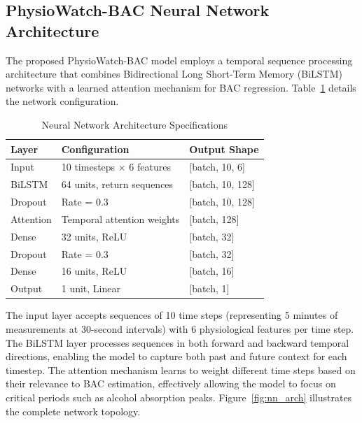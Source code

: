 \documentclass[HARVARD,Times2COL]{WileyNJDv5} %
\providecommand{\DIFadd}[1]{{\protect\color{red} #1}} %
\providecommand{\DIFaddbegin}{} %
\providecommand{\DIFaddend}{} %
\providecommand{\DIFaddincludegraphics}[2][]{{\color{blue}\fbox{\DIFOincludegraphics[#1]{#2}}}} %
\DeclareRobustCommand{\DIFaddbegin}{\DIFOaddbegin \let\includegraphics\DIFaddincludegraphics} %
\DeclareRobustCommand{\DIFaddend}{\DIFOaddend \let\includegraphics\DIFOincludegraphics} %
\begin{document}
\DIFaddend \subsection{PhysioWatch-BAC Neural Network Architecture}
The proposed PhysioWatch-BAC model employs a temporal sequence processing architecture that combines Bidirectional Long Short-Term Memory (BiLSTM) networks with a learned attention mechanism for BAC regression. Table~\ref{tab:model_arch} details the network configuration.
\begin{table}[htbp]
\caption{Neural Network Architecture Specifications}
\label{tab:model_arch}
\centering
\small
\begin{tabular}{@{}lll@{}}
\toprule
\textbf{Layer} & \textbf{Configuration} & \textbf{Output Shape} \\
\midrule
Input & 10 timesteps $\times$ 6 features & [batch, 10, 6] \\
BiLSTM & 64 units, return sequences & [batch, 10, 128] \\
Dropout & Rate = 0.3 & [batch, 10, 128] \\
Attention & Temporal attention weights & [batch, 128] \\
Dense & 32 units, ReLU & [batch, 32] \\
Dropout & Rate = 0.3 & [batch, 32] \\
Dense & 16 units, ReLU & [batch, 16] \\
Output & 1 unit, Linear & [batch, 1] \\
\bottomrule
\end{tabular}
\end{table}
The input layer accepts sequences of 10 time steps (representing 5 minutes of measurements at 30-second intervals) with 6 physiological features per time step. The BiLSTM layer processes sequences in both forward and backward temporal directions, enabling the model to capture both past and future context for each timestep. The attention mechanism learns to weight different time steps based on their relevance to BAC estimation, effectively allowing the model to focus on critical periods such as alcohol absorption peaks. \DIFaddbegin \DIFadd{Figure~\ref{fig:nn_arch} illustrates the complete network topology.
}
\end{document}
